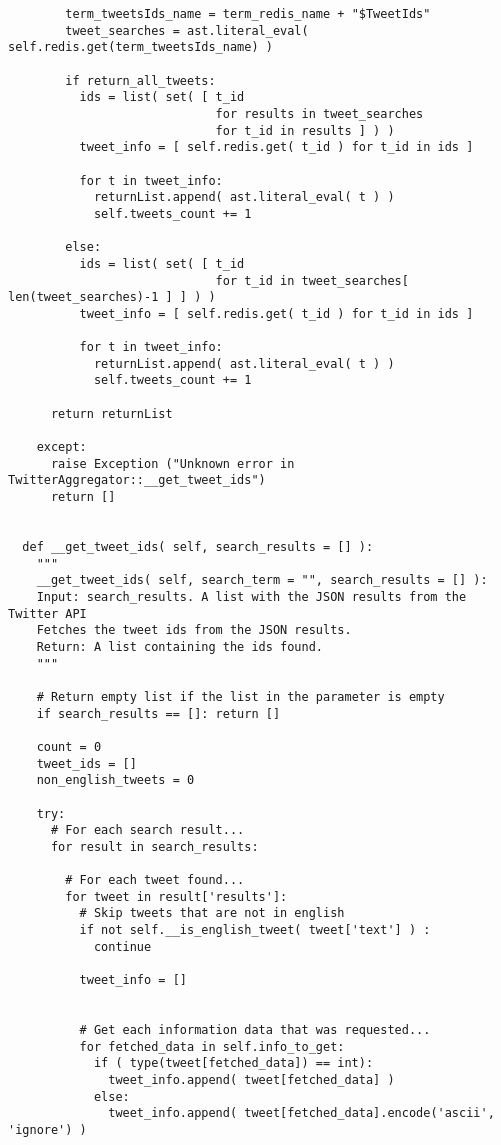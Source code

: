 \begin{verbatim}
        term_tweetsIds_name = term_redis_name + "$TweetIds"
        tweet_searches = ast.literal_eval( self.redis.get(term_tweetsIds_name) )
        
        if return_all_tweets:
          ids = list( set( [ t_id 
                             for results in tweet_searches 
                             for t_id in results ] ) )
          tweet_info = [ self.redis.get( t_id ) for t_id in ids ]
          
          for t in tweet_info:
            returnList.append( ast.literal_eval( t ) )
            self.tweets_count += 1
        
        else:
          ids = list( set( [ t_id 
                             for t_id in tweet_searches[ len(tweet_searches)-1 ] ] ) )
          tweet_info = [ self.redis.get( t_id ) for t_id in ids ]

          for t in tweet_info:
            returnList.append( ast.literal_eval( t ) )
            self.tweets_count += 1
      
      return returnList
    
    except:
      raise Exception ("Unknown error in TwitterAggregator::__get_tweet_ids")
      return []
  
  
  def __get_tweet_ids( self, search_results = [] ):
    """
    __get_tweet_ids( self, search_term = "", search_results = [] ):
    Input: search_results. A list with the JSON results from the Twitter API
    Fetches the tweet ids from the JSON results.
    Return: A list containing the ids found.
    """
    
    # Return empty list if the list in the parameter is empty
    if search_results == []: return []
    
    count = 0
    tweet_ids = []
    non_english_tweets = 0
    
    try:
      # For each search result...
      for result in search_results:
      
        # For each tweet found...
        for tweet in result['results']:
          # Skip tweets that are not in english
          if not self.__is_english_tweet( tweet['text'] ) :
            continue
            
          tweet_info = []


          # Get each information data that was requested...
          for fetched_data in self.info_to_get:
            if ( type(tweet[fetched_data]) == int): 
              tweet_info.append( tweet[fetched_data] )
            else: 
              tweet_info.append( tweet[fetched_data].encode('ascii', 'ignore') )
            

\end{verbatim}
